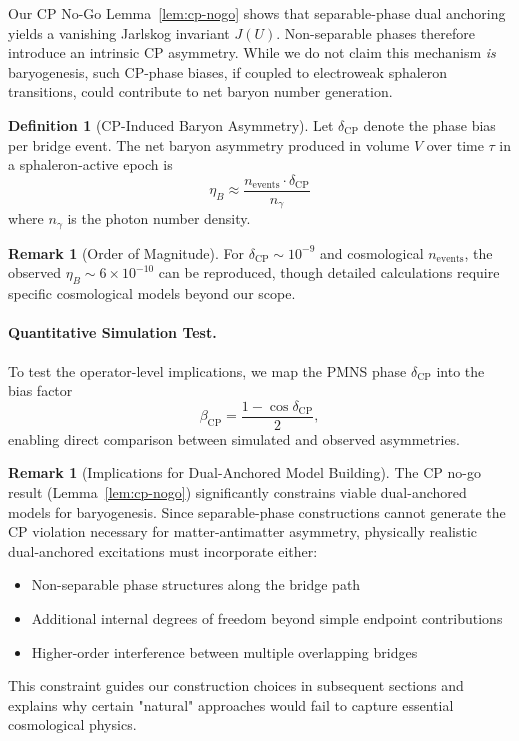 \documentclass[11pt]{article}
\theoremstyle{plain}
\theoremstyle{definition}
\newtheorem{definition}[theorem]{Definition}
\newtheorem{remark}[theorem]{Remark}
\begin{document}
Our CP No-Go Lemma~\ref{lem:cp-nogo} shows that separable-phase dual anchoring yields a vanishing Jarlskog invariant $J(U)$. Non-separable phases therefore introduce an intrinsic CP asymmetry. While we do not claim this mechanism \emph{is} baryogenesis, such CP-phase biases, if coupled to electroweak sphaleron transitions, could contribute to net baryon number generation.

\begin{definition}[CP-Induced Baryon Asymmetry]
  Let $\delta_{\text{CP}}$ denote the phase bias per bridge event. The net baryon asymmetry produced in volume $V$ over time $\tau$ in a sphaleron-active epoch is
  \begin{equation}
    \eta_B \approx \frac{n_{\text{events}} \cdot \delta_{\text{CP}}}{n_\gamma}
  \end{equation}
  where $n_\gamma$ is the photon number density.
\end{definition}

\begin{remark}[Order of Magnitude]
  For $\delta_{\text{CP}} \sim 10^{-9}$ and cosmological $n_{\text{events}}$, the observed $\eta_B \sim 6\times 10^{-10}$ can be reproduced, though detailed calculations require specific cosmological models beyond our scope.
\end{remark}

\paragraph{Quantitative Simulation Test.}
To test the operator-level implications, we map the PMNS phase $\delta_{\mathrm{CP}}$ into the bias factor
\[
  \beta_{\mathrm{CP}} = \frac{1 - \cos \delta_{\mathrm{CP}}}{2},
\]
enabling direct comparison between simulated and observed asymmetries.

\begin{remark}[Implications for Dual-Anchored Model Building]
  The CP no-go result (Lemma~\ref{lem:cp-nogo}) significantly constrains viable dual-anchored
  models for baryogenesis. Since separable-phase constructions cannot generate the CP violation
  necessary for matter-antimatter asymmetry, physically realistic dual-anchored excitations must
  incorporate either:
  \begin{itemize}
    \item Non-separable phase structures along the bridge path
    \item Additional internal degrees of freedom beyond simple endpoint contributions
    \item Higher-order interference between multiple overlapping bridges
  \end{itemize}
  This constraint guides our construction choices in subsequent sections and explains why
  certain "natural" approaches would fail to capture essential cosmological physics.
\end{remark}
\end{document}
